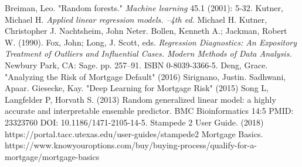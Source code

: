 \newpage
\begin{thebibliography}{99}
Breiman, Leo. "Random forests." \textit{Machine learning} 45.1 (2001): 5-32.
Kutner, Michael H. 
\textit{Applied linear regression models. --4th ed.} Michael H. Kutner, Christopher J. Nachtsheim, John Neter.
Bollen, Kenneth A.; Jackman, Robert W. (1990). Fox, John; Long, J. Scott, eds. 
\textit{Regression Diagnostics: An Expository Treatment of Outliers and Influential Cases. Modern Methods of Data Analysis.}
Newbury Park, CA: Sage. pp. 257–91. ISBN 0-8039-3366-5.
Deng, Grace. "Analyzing the Risk of Mortgage Default" (2016)
Sirignano, Justin. Sadhwani, Apaar. Giesecke, Kay. "Deep Learning for Mortgage Risk" (2015)
Song L, Langfelder P, Horvath S. (2013) Random generalized linear model: a highly accurate and interpretable ensemble predictor. BMC Bioinformatics 14:5 PMID: 23323760 DOI: 10.1186/1471-2105-14-5.
Stampede 2 User Guide. (2018) https://portal.tacc.utexas.edu/user-guides/stampede2
Mortgage Basics. https://www.knowyouroptions.com/buy/buying-process/qualify-for-a-mortgage/mortgage-basics
\end{thebibliography}
